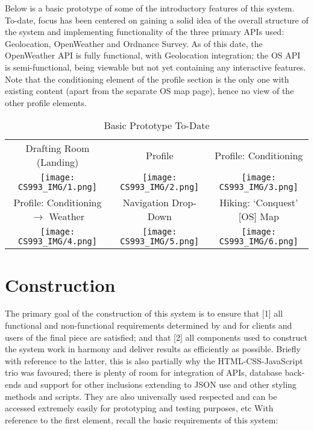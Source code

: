 \documentclass[11pt, english]{article}
\begin{document}
	Below is a basic prototype of some of the introductory features of this system. To-date, focus has been centered on gaining a solid idea of the overall structure of the system and implementing functionality of the three primary APIs used: Geolocation, OpenWeather and Ordnance Survey. As of this date, the OpenWeather API is fully functional, with Geolocation integration; the OS API is semi-functional, being viewable but not yet containing any interactive features. Note that the conditioning element of the profile section is the only one with existing content (apart from the separate OS map page), hence no view of the other profile elements.

	\begin{table}[h]
		\scriptsize
		\renewcommand{\arraystretch}{1.25}
	\begin{center}
	\begin{tabular}{ccc}
		Drafting Room (Landing) & Profile & Profile: Conditioning\\
		\texttt{[image: CS993\_IMG/1.png]} & \texttt{[image: CS993\_IMG/2.png]} & \texttt{[image: CS993\_IMG/3.png]}\\
		Profile: Conditioning $\rightarrow$ Weather & Navigation Drop-Down & Hiking: `Conquest' [OS] Map\\
		\texttt{[image: CS993\_IMG/4.png]} & \texttt{[image: CS993\_IMG/5.png]} & \texttt{[image: CS993\_IMG/6.png]}\\
	\end{tabular}
		\caption{Basic Prototype To-Date}
	\end{center}
	\end{table}

\newpage

\section{Construction}
	
	The primary goal of the construction of this system is to ensure that [1] all functional and non-functional requirements determined by and for clients and users of the final piece are satisfied; and that [2] all components used to construct the system work in harmony and deliver results as efficiently as possible. Briefly with reference to the latter, this is also partially why the HTML-CSS-JavaScript trio was favoured; there is plenty of room for integration of APIs, database back-ends and support for other inclusions extending to JSON use and other styling methods and scripts. They are also universally used respected and can be accessed extremely easily for prototyping and testing purposes, etc With reference to the first element, recall the basic requirements of this system:
\end{document}
